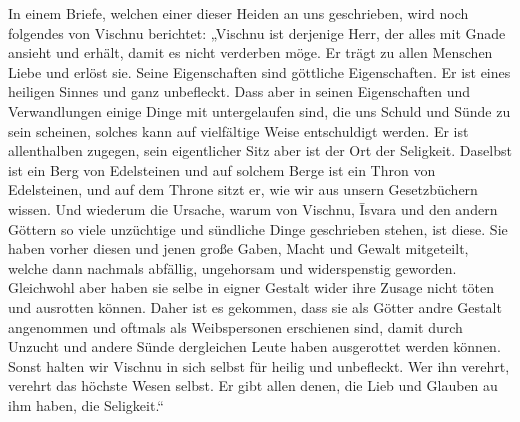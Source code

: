 \documentclass{article}
\begin{document}
In einem Briefe, welchen einer dieser Heiden an uns geschrieben, wird noch folgendes von Vischnu berichtet: „Vischnu ist derjenige Herr, der alles mit Gnade ansieht und erhält, damit es nicht verderben möge. Er trägt zu allen Menschen Liebe und erlöst sie. Seine Eigenschaften sind göttliche Eigenschaften. Er ist eines heiligen Sinnes und ganz unbefleckt. Dass aber in seinen Eigenschaften und Verwandlungen einige Dinge mit untergelaufen sind, die uns Schuld und Sünde zu sein scheinen, solches kann auf vielfältige Weise entschuldigt werden. Er ist allenthalben zugegen, sein eigentlicher Sitz aber ist der Ort der Seligkeit. Daselbst ist ein Berg von Edelsteinen und auf solchem Berge ist ein Thron von Edelsteinen, und auf dem Throne sitzt er, wie wir aus unsern Gesetzbüchern wissen. Und wiederum die Ursache, warum von Vischnu, \={I}svara und den andern Göttern so viele unzüchtige und sündliche Dinge geschrieben stehen, ist diese. Sie haben vorher diesen und jenen große Gaben, Macht und Gewalt mitgeteilt, welche dann nachmals abfällig, ungehorsam und widerspenstig geworden. Gleichwohl aber haben sie selbe in eigner Gestalt wider ihre Zusage nicht töten und ausrotten können. Daher ist es gekommen, dass sie als Götter andre Gestalt angenommen und oftmals als Weibspersonen erschienen sind, damit durch Unzucht und andere Sünde dergleichen Leute haben ausgerottet werden können. Sonst halten wir Vischnu in sich selbst für heilig und unbefleckt. Wer ihn verehrt, verehrt das höchste Wesen selbst. Er gibt allen denen, die Lieb und Glauben au ihm haben, die Seligkeit.“

\begin{center}
\end{center}
\end{document}
